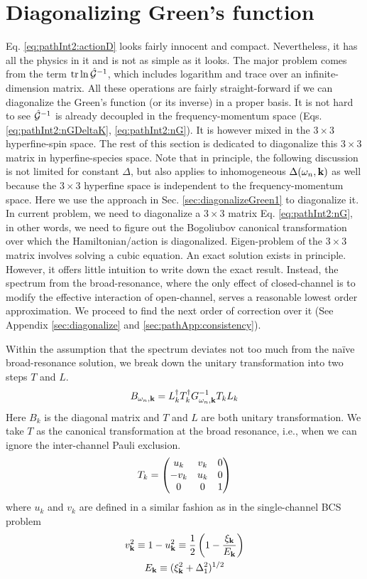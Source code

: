 \section{Diagonalizing Green's function\label{sec:diagonalGreen}}
Eq. \eqref{eq:pathInt2:actionD} looks fairly innocent and compact.  Nevertheless, it has all the physics in it and is not as simple as it looks.  The major problem comes from the term $\text{tr}\ln\hat{\mathcal{G}}^{-1}$, which includes  logarithm and trace over an infinite-dimension matrix.   All these operations are fairly straight-forward if we can diagonalize the  Green's function (or its inverse) in a proper basis.      It is not hard to see $\hat{\mathcal{G}}^{-1}$ is already decoupled in the frequency-momentum space (Eqs.  \ref{eq:pathInt2:nGDeltaK}, \ref{eq:pathInt2:nG}).  It is however mixed in the $3\times3$ hyperfine-spin space.  The rest of this section is dedicated to diagonalize this $3\times3$ matrix in hyperfine-species space.  Note that in principle, the following discussion is not limited for constant $\Delta$, but also applies to inhomogeneous $\Delta(\omega_{n},\mathbf{k})$ as well because the $3\times3$ hyperfine space is independent to the frequency-momentum space.   Here we use the approach in Sec. \ref{sec:diagonalizeGreen1} to diagonalize it.   
In current problem, we need to diagonalize a $3\times3$ matrix Eq. \ref{eq:pathInt2:nG}, in other words, we need to figure out the Bogoliubov canonical transformation over which the Hamiltonian/action is diagonalized.   Eigen-problem of the $3\times3$ matrix involves solving a cubic equation. An exact solution exists in principle.  However,  it offers little intuition to write down the exact result. Instead,  the spectrum from the broad-resonance, where the only effect of closed-channel is to modify the effective interaction of open-channel, serves a reasonable lowest order approximation. We proceed to find the next order of correction over it (See Appendix \ref{sec:diagonalize} and \ref{sec:pathApp:consistency}). 


Within the assumption that the spectrum  deviates not too much from the na\"{i}ve broad-resonance solution, we  break down the unitary transformation into two steps $T$ and $L$. 
\begin{equation}\label{eq:pathInt2:B}
B_{\omega_{n},\mathbf{k}}=L_k^{\dagger}T_k^{\dagger}G_{\omega_{n},\mathbf{k}}^{-1}T_kL_k
\end{equation} 
Here $B_{k}$ is the diagonal matrix and $T$ and $L$ are both unitary transformation.  We take $T$ as the canonical transformation at the broad resonance, i.e., when we can ignore the inter-channel Pauli exclusion. 
\begin{equation}\label{eq:pathInt2:T}
T_k=\begin{pmatrix}u_k&v_k&0\\-v_k&u_k&0\\0&0&1\end{pmatrix}
\end{equation}
where $u_{k}$ and $v_{k}$ are defined in a similar fashion as in the single-channel BCS  problem
\begin{gather}
v_{\mathbf{k}}^{2}\equiv1-u_{\mathbf{k}}^{2}\equiv\frac{1}{2}\left(1-\frac{\xi_{\mathbf{k}}}{E_{\mathbf{k}}}\right)\\
E_{\mathbf{k}}\equiv(\xi_{\mathbf{k}}^{2}+\Delta_{1}^{2})^{1/2}
\end{gather}

